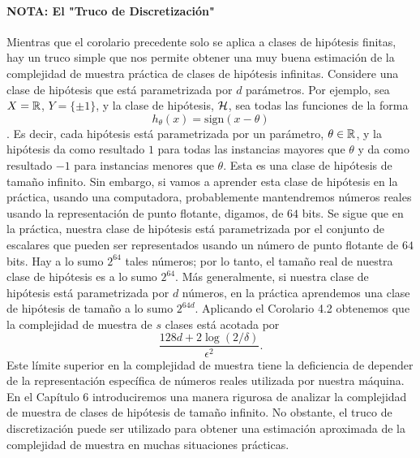 \paragraph{NOTA: El "Truco de Discretización"} Mientras que el corolario precedente solo se aplica a clases de hipótesis finitas, hay un truco simple que nos permite obtener una muy buena estimación de la complejidad de muestra práctica de clases de hipótesis infinitas. Considere una clase de hipótesis que está parametrizada por $ d $ parámetros. Por ejemplo, sea $ X = \mathop{\mbox{$\mathbb{R}$}}\nolimits$, $ Y = \{\pm 1\}$, y la clase de hipótesis, $ \mathop{\mbox{$\mathcal{H}$}}\nolimits $, sea todas las funciones de la forma $$ h_\theta(x) = \text{sign}(x - \theta) $$. Es decir, cada hipótesis está parametrizada por un parámetro, $\theta \in \mathop{\mbox{$\mathbb{R}$}}\nolimits $, y la hipótesis da como resultado $1$ para todas las instancias mayores que $ \theta $ y da como resultado $ -1 $ para instancias menores que $ \theta $. Esta es una clase de hipótesis de tamaño infinito. Sin embargo, si vamos a aprender esta clase de hipótesis en la práctica, usando una computadora, probablemente mantendremos números reales usando la representación de punto flotante, digamos, de $64$ bits. Se sigue que en la práctica, nuestra clase de hipótesis está parametrizada por el conjunto de escalares que pueden ser representados usando un número de punto flotante de $64$ bits. Hay a lo sumo $ 2^{64} $ tales números; por lo tanto, el tamaño real de nuestra clase de hipótesis es a lo sumo $ 2^{64} $. Más generalmente, si nuestra clase de hipótesis está parametrizada por $ d $ números, en la práctica aprendemos una clase de hipótesis de tamaño a lo sumo $ 2^{64d} $. Aplicando el Corolario 4.2 obtenemos que la complejidad de muestra de $s$ clases está acotada por 
$$ \frac{128d + 2 \log(2/\delta)}{\epsilon^2}. $$ 
Este límite superior en la complejidad de muestra tiene la deficiencia de depender de la representación específica de números reales utilizada por nuestra máquina. En el Capítulo 6 introduciremos una manera rigurosa de analizar la complejidad de muestra de clases de hipótesis de tamaño infinito. No obstante, el truco de discretización puede ser utilizado para obtener una estimación aproximada de la complejidad de muestra en muchas situaciones prácticas.

